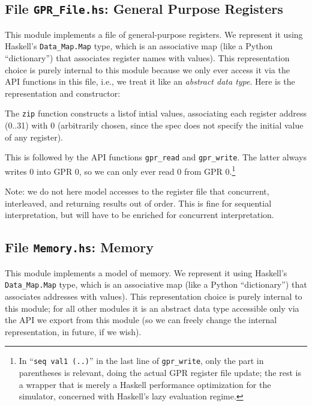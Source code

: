\documentclass[11pt]{article}
\begin{document}
\subsection{File {\tt GPR\_File.hs}: General Purpose Registers}

\label{sec_gprs}

This module implements a file of general-purpose registers.  We
represent it using Haskell's \verb|Data_Map.Map| type, which is an
associative map (like a Python ``dictionary'') that associates
register names with values).  This representation choice is purely
internal to this module because we only ever access it via the API
functions in this file, i.e., we treat it like an \emph{abstract data
type}.  Here is the representation and constructor:



The \verb|zip| function constructs a listof intial values, associating
each register address (0..31) with 0 (arbitrarily chosen, since the
spec does not specify the initial value of any register).

This is followed by the API functions \verb|gpr_read| and
\verb|gpr_write|.  The latter always writes 0 into GPR 0, so we can
only ever read 0 from GPR 0.\footnote{In ``{\tt seq~val1~(..)}'' in
the last line of {\tt gpr\_write}, only the part in parentheses is
relevant, doing the actual GPR register file update; the rest is a
wrapper that is merely a Haskell performance optimization for the
simulator, concerned with Haskell's lazy evaluation regime.}

Note: we do not here model accesses to the register file that
concurrent, interleaved, and returning results out of order.  This is
fine for sequential interpretation, but will have to be enriched for
concurrent interpretation.


\subsection{File {\tt Memory.hs}: Memory}

\label{sec_memory}

This module implements a model of memory.  We represent it using
Haskell's \verb|Data_Map.Map| type, which is an associative map (like
a Python ``dictionary'') that associates addresses with values).  This
representation choice is purely internal to this module; for all other
modules it is an abstract data type accessible only via the API we
export from this module (so we can freely change the internal
representation, in future, if we wish).
\end{document}
